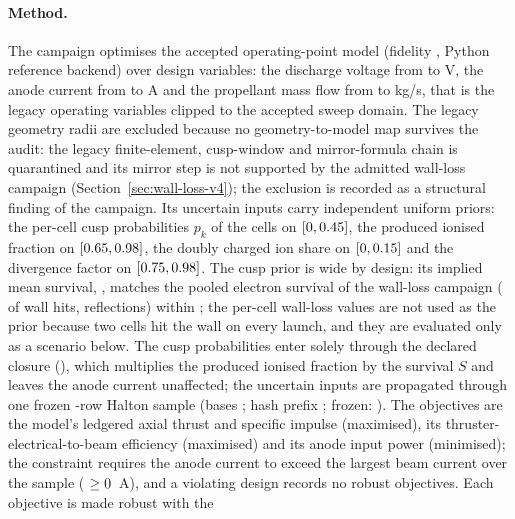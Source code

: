 \paragraph{Method.}
The campaign optimises the accepted operating-point model (fidelity
\texttt{\MdoFidelity}, Python reference backend) over \MdoDesignVariableCount{}
design variables: the discharge voltage from \MdoUaLower{} to \MdoUaUpper{} V, the
anode current from \MdoIaLower{} to \MdoIaUpper{} A and the propellant mass flow from
\MdoMdotLower{} to \MdoMdotUpper{} kg/s, that is the legacy operating variables
clipped to the accepted sweep domain. The \MdoExcludedVariableCount{} legacy
geometry radii are excluded because no geometry-to-model map survives the audit:
the legacy finite-element, cusp-window and mirror-formula chain is quarantined and
its mirror step is not supported by the admitted wall-loss campaign
(Section~\ref{sec:wall-loss-v4}); the exclusion is recorded as a structural finding
of the campaign. Its \MdoUncertainInputCount{} uncertain inputs carry independent
uniform priors: the per-cell cusp probabilities $p_k$ of the \MdoCellCount{} cells
on $[0, 0.45]$, the produced ionised fraction on
$[0.65, 0.98]$, the doubly charged ion share on
$[0, 0.15]$ and the divergence factor on
$[0.75, 0.98]$. The cusp prior is wide by design: its implied
mean survival, \MdoImpliedPriorSurvival, matches the pooled electron survival
\MdoVFourSurvival{} of the wall-loss campaign (\MdoVFourWallHits{} of
\MdoVFourTrials{} wall hits, \MdoVFourReflections{} reflections) within
\MdoSurvivalCalibrationGap; the per-cell wall-loss values are not used as the prior
because two cells hit the wall on every launch, and they are evaluated only as a
scenario below. The cusp probabilities enter solely through the declared closure
\texttt{\MdoClosureId} (\MdoClosureStatus), which multiplies the produced ionised
fraction by the survival $S$ and leaves the anode current unaffected; the
uncertain inputs are propagated through one frozen \MdoSampleCount-row Halton
sample (bases \MdoSampleBases; hash prefix \texttt{\MdoSampleSha}; frozen:
\MdoSampleFrozen). The \MdoObjectiveCount{} objectives are the model's ledgered
axial thrust and specific impulse (maximised), its thruster-electrical-to-beam
efficiency (maximised) and its anode input power (minimised); the constraint
requires the anode current to exceed the largest beam current over the sample
(\texttt{\MdoConstraintName} $\ge 0$~A), and a violating
design records no robust objectives. Each objective is made robust with the
